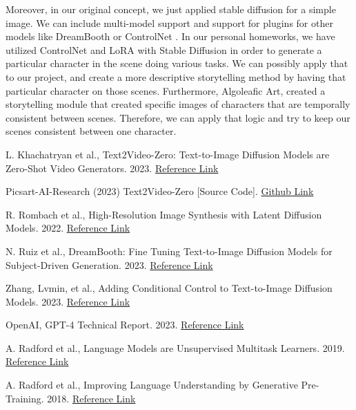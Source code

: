\documentclass[conference]{IEEEtran}
\begin{document}
Moreover, in our original concept, we just applied stable diffusion for a simple image. We can include multi-model support and support for plugins for other models like DreamBooth \cite{dreambooth} or ControlNet \cite{controlnet}. In our personal homeworks, we have utilized ControlNet and LoRA \cite{lora} with Stable Diffusion in order to generate a particular character in the scene doing various tasks. We can possibly apply that to our project, and create a more descriptive storytelling method by having that particular character on those scenes. Furthermore, Algoleafic Art, created a storytelling module that created specific images of characters that are temporally consistent between scenes. Therefore, we can apply that logic and try to keep our scenes consistent between one character. 

\begin{thebibliography}{00}

 L. Khachatryan et al., Text2Video-Zero: Text-to-Image Diffusion Models are Zero-Shot Video Generators. 2023. \href{https://arxiv.org/pdf/2303.13439.pdf}{Reference Link}

 Picsart-AI-Research (2023) Text2Video-Zero [Source Code]. \href{https://github.com/Picsart-AI-Research/Text2Video-Zero}{Github Link}

 R. Rombach et al., High-Resolution Image Synthesis with Latent Diffusion Models. 2022. \href{https://arxiv.org/pdf/2112.10752.pdf}{Reference Link}

 N. Ruiz et al., DreamBooth: Fine Tuning Text-to-Image Diffusion Models for Subject-Driven Generation. 2023. \href{https://arxiv.org/pdf/2208.12242.pdf}{Reference Link}

 Zhang, Lvmin, et al., Adding Conditional Control to Text-to-Image Diffusion Models. 2023. \href{http://arxiv.org/abs/2302.05543.}{Reference Link}

 OpenAI, GPT-4 Technical Report. 2023. \href{https://arxiv.org/pdf/2303.08774.pdf}{Reference Link}

 A. Radford et al., Language Models are Unsupervised Multitask Learners. 2019. \href{https://d4mucfpksywv.cloudfront.net/better-language-models/language_models_are_unsupervised_multitask_learners.pdf}{Reference Link}

 A. Radford et al., Improving Language Understanding by Generative Pre-Training. 2018. \href{https://s3-us-west-2.amazonaws.com/openai-assets/research-covers/language-unsupervised/language_understanding_paper.pdf}{Reference Link}


\end{thebibliography}
\end{document}

